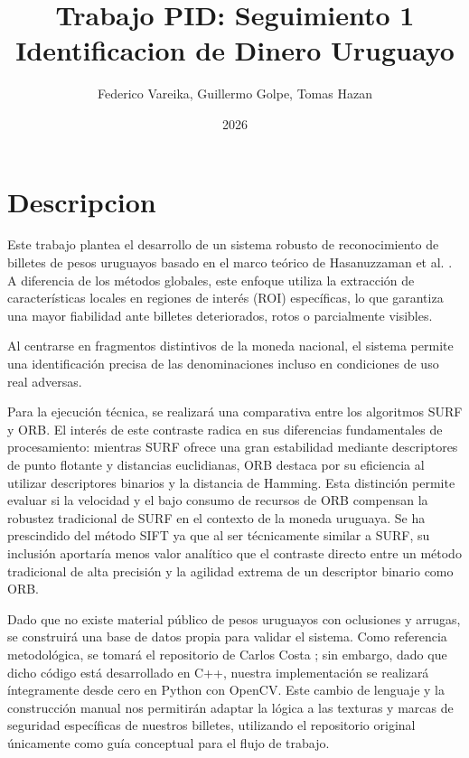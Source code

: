 \documentclass[12pt, a4paper]{article}
\title{
    {Trabajo PID: Seguimiento 1}\\
    {\large Identificacion de Dinero Uruguayo}
}
\author{Federico Vareika, Guillermo Golpe, Tomas Hazan}
\date{2026}
\begin{document}
\maketitle

\newpage

\section*{Descripcion}
Este trabajo plantea el desarrollo de un sistema robusto de reconocimiento de
billetes de pesos uruguayos basado en el marco teórico de Hasanuzzaman et al. 
\cite{hasanuzzaman2012robust}.
A diferencia de los métodos globales, este enfoque utiliza la extracción de 
características locales en regiones de interés (ROI) específicas, lo que 
garantiza una mayor fiabilidad ante billetes deteriorados, rotos o parcialmente 
visibles. 

Al centrarse en fragmentos distintivos de la moneda nacional, el sistema permite
una identificación precisa de las denominaciones incluso en condiciones de uso 
real adversas.

Para la ejecución técnica, se realizará una comparativa entre los algoritmos 
SURF y ORB. El interés de este contraste radica en sus diferencias fundamentales 
de procesamiento: mientras SURF ofrece una gran estabilidad mediante descriptores 
de punto flotante y distancias euclidianas, ORB destaca por su eficiencia al 
utilizar descriptores binarios y la distancia de Hamming. Esta distinción 
permite evaluar si la velocidad y el bajo consumo de recursos de ORB compensan 
la robustez tradicional de SURF en el contexto de la moneda uruguaya. Se ha 
prescindido del método SIFT ya que al ser técnicamente similar a SURF, su 
inclusión aportaría menos valor analítico que el contraste directo entre un 
método tradicional de alta precisión y la agilidad extrema de un descriptor 
binario como ORB.

Dado que no existe material público de pesos uruguayos con oclusiones y arrugas,
se construirá una base de datos propia para validar el sistema. Como referencia
metodológica, se tomará el repositorio de Carlos Costa \cite{carlosmccosta}; 
sin embargo, dado que dicho código está desarrollado en C++, nuestra
implementación se realizará íntegramente desde cero en Python con OpenCV. Este 
cambio de lenguaje y la construcción manual nos permitirán adaptar la lógica a
las texturas y marcas de seguridad específicas de nuestros billetes, utilizando 
el repositorio original únicamente como guía conceptual para el flujo de trabajo.
\end{document}
